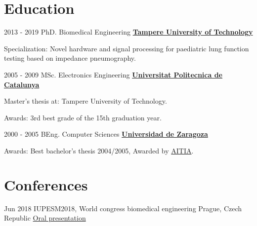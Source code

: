\documentclass[letterpaper]{twentysecondcv} %
\begin{document}
\begin{RigthPage2}
\section{Education}


\begin{twenty} %
	\twentyitemlist
    	{2013 - 2019}
        {PhD. Biomedical Engineering}
        {\href{https://www.tut.fi/}{\textbf{Tampere University of Technology}}}
        {
        \item Specialization: Novel hardware and signal processing for paediatric lung function testing based on impedance pneumography.}
	\twentyitemlist
    	{2005 - 2009}
        {MSc. Electronics Engineering}
        {\href{https://www.upc.cat}{\textbf{Universitat Politecnica de Catalunya}}}
        {
        \item Master's thesis at: Tampere University of Technology.
        \item Awards: 3rd best grade of the 15th graduation year.
        }
     \twentyitemlist
    	{2000 - 2005}
        {BEng. Computer Sciences }
        {\href{http://www.unizar.es/}{\textbf{Universidad de Zaragoza } }}
        {
        \item Awards: Best bachelor's thesis 2004/2005, Awarded by \href{http://www.aitia.org/}{AITIA}.}
\end{twenty}


\section{Conferences }

\begin{twenty} %

	\twentyitem
    	{Jun 2018}
        {IUPESM2018, World congress biomedical engineering}
        {Prague, Czech Republic}
        {\href{https://www.slideshare.net/slideshow/embed_code/key/z0l5pXuzNVj5EG}{Oral presentation}}
        


\end{twenty}
\end{RigthPage2}
\end{document}

